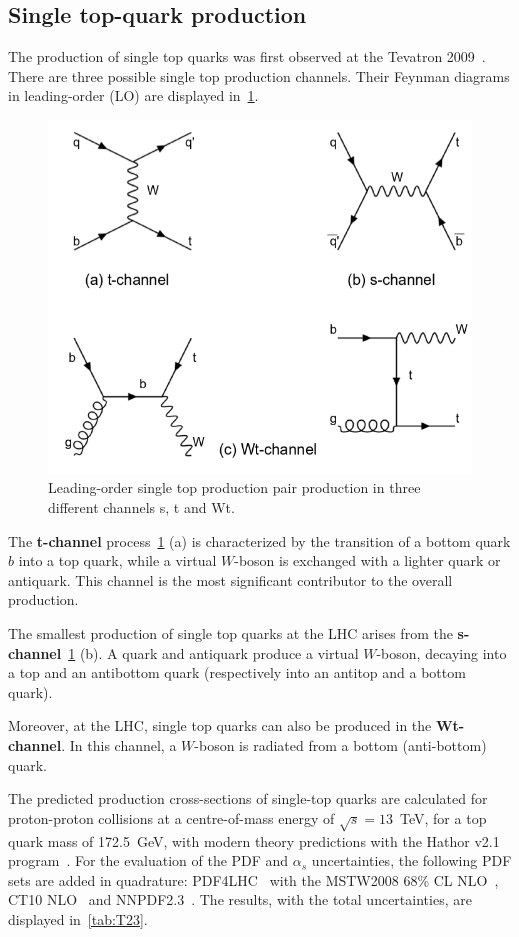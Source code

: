 \subsection{Single top-quark production}
The production of single top quarks was first observed at the Tevatron 2009~\cite{Abazov:2009ii,Aaltonen:2009jj}. There are three possible single top production channels. Their Feynman diagrams in leading-order (LO) are displayed in~\cref{fig:single}.


\begin{figure}[h]
	\centering
	\includegraphics[width=0.5\linewidth]{Pics/cp1/single}
	\caption{Leading-order single top production pair production in three different channels s, t and Wt.} 
	\label{fig:single}
\end{figure}

 The \textbf{t-channel} process~\cref{fig:single} (a) is characterized by the transition of a bottom quark $b$ into a top quark, while a virtual $W$-boson is exchanged with a lighter quark or antiquark. This channel is the most significant contributor to the overall production.

The smallest production of single top quarks at the LHC arises from the \textbf{s-channel}~\cref{fig:single} (b). A quark and antiquark produce a virtual $W$-boson, decaying into a top and an antibottom quark (respectively into an antitop and a bottom quark).

Moreover, at the LHC, single top quarks can also be produced in the \textbf{Wt-channel}. In this channel, a $W$-boson is radiated from a bottom (anti-bottom) quark.

The  predicted production cross-sections of single-top quarks are calculated  for proton-proton collisions at a centre-of-mass energy of $\sqrt{s}=13$~TeV, for a top quark mass of 172.5~GeV, with modern theory predictions with the Hathor v2.1 program~\cite{Aliev:2010zk,Kant:2014oha}. For the evaluation of the PDF and $\alpha_{s}$ uncertainties, the following PDF sets are added in quadrature: PDF4LHC~\cite{Botje:2011sn} with the MSTW2008 68\% CL NLO~\cite{Martin:2009bu,Martin:2009iq}, CT10 NLO~\cite{Lai:2010vv} and NNPDF2.3~\cite{Ball:2012cx}. The results, with the total uncertainties, are displayed in~\cref{tab:T23}.



